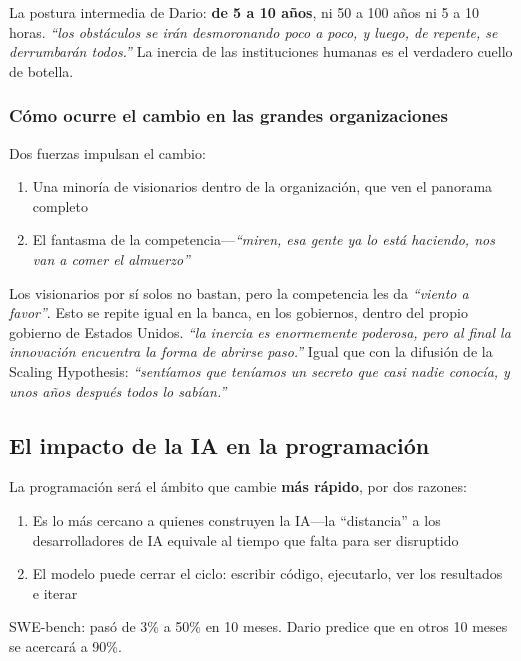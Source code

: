 La postura intermedia de Dario: \textbf{de 5 a 10 años}, ni 50 a 100 años ni 5 a 10 horas. \textit{``los obstáculos se irán desmoronando poco a poco, y luego, de repente, se derrumbarán todos.''} La inercia de las instituciones humanas es el verdadero cuello de botella.

\subsubsection{Cómo ocurre el cambio en las grandes organizaciones}

Dos fuerzas impulsan el cambio:
\begin{enumerate}
    \item Una minoría de visionarios dentro de la organización, que ven el panorama completo
    \item El fantasma de la competencia—\textit{``miren, esa gente ya lo está haciendo, nos van a comer el almuerzo''}
\end{enumerate}

Los visionarios por sí solos no bastan, pero la competencia les da \textit{``viento a favor''}. Esto se repite igual en la banca, en los gobiernos, dentro del propio gobierno de Estados Unidos. \textit{``la inercia es enormemente poderosa, pero al final la innovación encuentra la forma de abrirse paso.''} Igual que con la difusión de la Scaling Hypothesis: \textit{``sentíamos que teníamos un secreto que casi nadie conocía, y unos años después todos lo sabían.''}

\subsection{El impacto de la IA en la programación}

La programación será el ámbito que cambie \textbf{más rápido}, por dos razones:
\begin{enumerate}
    \item Es lo más cercano a quienes construyen la IA—la ``distancia'' a los desarrolladores de IA equivale al tiempo que falta para ser disruptido
    \item El modelo puede cerrar el ciclo: escribir código, ejecutarlo, ver los resultados e iterar
\end{enumerate}

SWE-bench: pasó de 3\% a 50\% en 10 meses. Dario predice que en otros 10 meses se acercará a 90\%.

